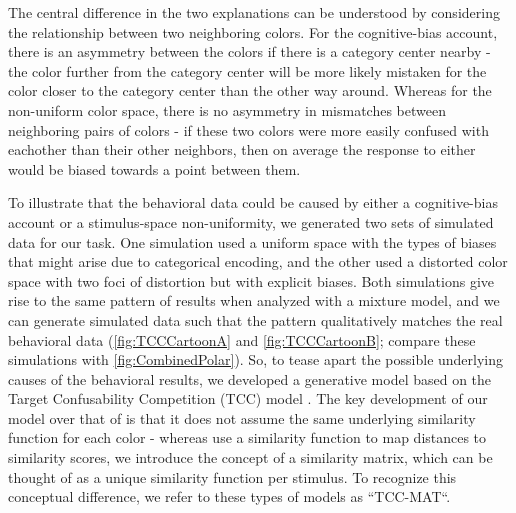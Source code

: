 The central difference in the two explanations can be understood by considering the relationship between two neighboring colors. 
For the cognitive-bias account, there is an asymmetry between the colors if there is a category center nearby - the color further from the category center will be more likely mistaken for the color closer to the category center than the other way around. 
Whereas for the non-uniform color space, there is no asymmetry in mismatches between neighboring pairs of colors - if these two colors were more easily confused with eachother than their other neighbors, then on average the response to either would be biased towards a point between them.

To illustrate that the behavioral data could be caused by either a cognitive-bias account or a stimulus-space non-uniformity, we generated two sets of simulated data for our task. 
One simulation used a uniform space with the types of biases that might arise due to categorical encoding, and the other used a distorted color space with two foci of distortion but with explicit biases. 
Both simulations give rise to the same pattern of results when analyzed with a mixture model, and we can generate simulated data such that the pattern qualitatively matches the real behavioral data (\autoref{fig:TCCCartoonA} and \autoref{fig:TCCCartoonB}; compare these simulations with \autoref{fig:CombinedPolar}). 
So, to tease apart the possible underlying causes of the behavioral results, we developed a generative model based on the Target Confusability Competition (TCC) model \citep{schurgin_psychophysical_2020}. 
The key development of our model over that of \cite{schurgin_psychophysical_2020} is that it does not assume the same underlying similarity function for each color - whereas \cite{schurgin_psychophysical_2020} use a similarity function to map distances to similarity scores, we introduce the concept of a similarity matrix, which can be thought of as a unique similarity function per stimulus. 
To recognize this conceptual difference, we refer to these types of models as ``TCC-MAT``.

